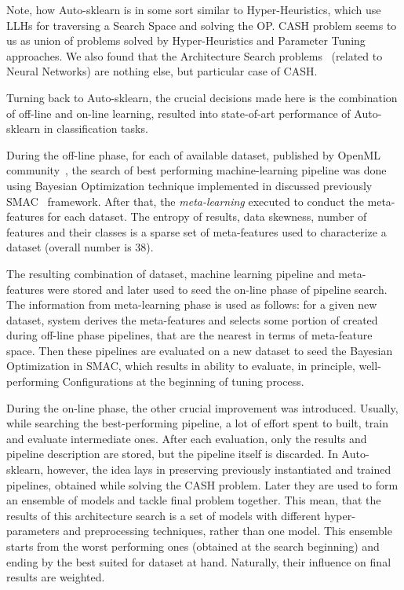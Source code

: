 Note, how Auto-sklearn is in some sort similar to Hyper-Heuristics, which use LLHs for traversing a Search Space and solving the OP. 
CASH problem seems to us as union of problems solved by Hyper-Heuristics and Parameter Tuning approaches. We also found that the Architecture Search problems~\cite{elsken2018neural} (related to Neural Networks) are nothing else, but particular case of CASH.


Turning back to Auto-sklearn, the crucial decisions made here is the combination of off-line and on-line learning, resulted into state-of-art performance of Auto-sklearn in classification tasks.

During the off-line phase, for each of available dataset, published by OpenML community~\cite{OpenMLPython2019}, the search of best performing machine-learning pipeline was done using Bayesian Optimization technique implemented in discussed previously SMAC~\cite{hutter2011sequential} framework.
After that, the \textit{meta-learning} executed to conduct the meta-features for each dataset. The entropy of results, data skewness, number of features and their classes is a sparse set of meta-features used to characterize a dataset (overall number is 38).

The resulting combination of dataset, machine learning pipeline and meta-features were stored and later used to seed the on-line phase of pipeline search.
The information from meta-learning phase is used as follows: for a given new dataset, system derives the meta-features and selects some portion of created during off-line phase pipelines, that are the nearest in terms of meta-feature space. Then these pipelines are evaluated on a new dataset to seed the Bayesian Optimization in SMAC, which results in ability to evaluate, in principle, well-performing Configurations at the beginning of tuning process.

During the on-line phase, the other crucial improvement was introduced. 
Usually, while searching the best-performing pipeline, a lot of effort spent to built, train and evaluate intermediate ones. After each evaluation, only the results and pipeline description are stored, but the pipeline itself is discarded. In Auto-sklearn, however, the idea lays in preserving previously instantiated and trained pipelines, obtained while solving the CASH problem. Later they are used to form an ensemble of models and tackle final problem together. This mean, that the results of this architecture search is a set of models with different hyper-parameters and preprocessing techniques, rather than one model. This ensemble starts from the worst performing ones (obtained at the search beginning) and ending by the best suited for dataset at hand. Naturally, their influence on final results are weighted.

